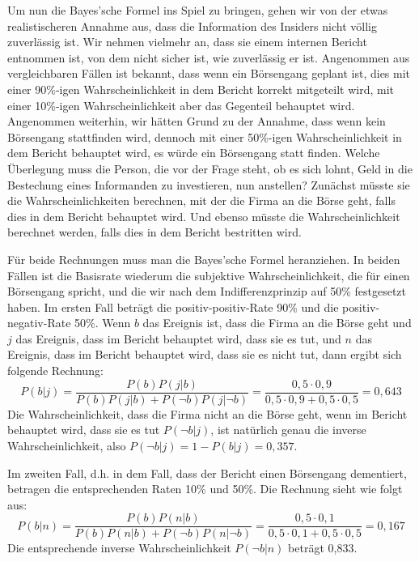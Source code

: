 Um nun die Bayes'sche Formel ins Spiel zu bringen, gehen wir von der etwas
realistischeren Annahme aus, dass die Information des Insiders nicht völlig
zuverlässig ist. Wir nehmen vielmehr an, dass sie einem internen Bericht
entnommen ist, von dem nicht sicher ist, wie zuverlässig er ist. Angenommen
aus vergleichbaren Fällen ist bekannt, dass wenn ein Börsengang geplant ist,
dies mit einer 90\%-igen Wahrscheinlichkeit in dem Bericht korrekt mitgeteilt
wird, mit einer 10\%-igen Wahrscheinlichkeit aber das Gegenteil behauptet wird.
Angenommen weiterhin, wir hätten Grund zu der Annahme, dass wenn kein
Börsengang stattfinden wird, dennoch mit einer 50\%-igen Wahrscheinlichkeit in
dem Bericht behauptet wird, es würde ein Börsengang statt finden. 
Welche Überlegung muss die Person, die vor der Frage steht, ob es sich lohnt,
Geld in die Bestechung eines Informanden zu investieren, nun anstellen?
Zunächst müsste sie die Wahrscheinlichkeiten berechnen, mit der die Firma an
die Börse geht, falls dies in dem Bericht behauptet wird. Und ebenso müsste die
Wahrscheinlichkeit berechnet werden, falls dies in dem Bericht bestritten wird.

Für beide Rechnungen muss man die Bayes'sche Formel heranziehen. In beiden Fällen
ist die Basisrate wiederum die subjektive Wahrscheinlichkeit, die für einen
Börsengang spricht, und die wir nach dem Indifferenzprinzip auf 50\% festgesetzt
haben. Im ersten Fall beträgt die positiv-positiv-Rate 90\% und die
positiv-negativ-Rate 50\%. Wenn $b$ das Ereignis ist, dass die Firma an die
Börse geht und $j$ das Ereignis, dass im Bericht behauptet wird, dass sie es
tut, und $n$ das Ereignis, dass im Bericht behauptet wird, dass sie es nicht tut, dann
ergibt sich folgende Rechnung: \[ P(b|j) = \frac{P(b)P(j|b)}{P(b)P(j|b) + P(\neg
b)P(j|\neg b)} =
   \frac{0,5\cdot 0,9}{0,5\cdot 0,9 + 0,5\cdot 0,5} = 0,643 \]
Die Wahrscheinlichkeit, dass die Firma nicht an die Börse geht, wenn im Bericht
behauptet wird, dass sie es tut $P(\neg b|j)$, ist natürlich genau die inverse
Wahrscheinlichkeit, also $P(\neg b|j) = 1 - P(b|j) = 0,357$.

Im zweiten Fall, d.h. in dem Fall, dass der Bericht einen Börsengang dementiert,
betragen die entsprechenden Raten 10\% und 50\%. Die Rechnung sieht wie folgt
aus:
\[ P(b|n) = \frac{P(b)P(n|b)}{P(b)P(n|b) + P(\neg b)P(n|\neg b)} =
   \frac{0,5\cdot 0,1}{0,5\cdot 0,1 + 0,5\cdot0,5} = 0,167 \]
Die entsprechende inverse Wahrscheinlichkeit $P(\neg b|n)$ beträgt 0,833.

